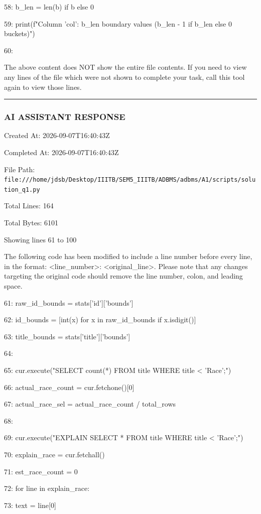 \documentclass[11pt,a4paper]{article}
\begin{document}
58:         b\_len = len(b) if b else 0

59:         print(f"Column '{col}': {b\_len} boundary values ({b\_len - 1 if b\_len else 0} buckets)")

60:

The above content does NOT show the entire file contents. If you need to view any lines of the file which were not shown to complete your task, call this tool again to view those lines.


\hrule

\subsubsection{AI ASSISTANT RESPONSE}

Created At: 2026-09-07T16:40:43Z

Completed At: 2026-09-07T16:40:43Z

File Path: \texttt{file:///home/jdsb/Desktop/IIITB/SEM5\_IIITB/ADBMS/adbms/A1/scripts/solution\_q1.py}

Total Lines: 164

Total Bytes: 6101

Showing lines 61 to 100

The following code has been modified to include a line number before every line, in the format: <line\_number>: <original\_line>. Please note that any changes targeting the original code should remove the line number, colon, and leading space.

61:     raw\_id\_bounds = stats['id']['bounds']

62:     id\_bounds = [int(x) for x in raw\_id\_bounds if x.isdigit()]

63:     title\_bounds = stats['title']['bounds']

64:

65:     cur.execute("SELECT count(*) FROM title WHERE title < 'Race';")

66:     actual\_race\_count = cur.fetchone()[0]

67:     actual\_race\_sel = actual\_race\_count / total\_rows

68:

69:     cur.execute("EXPLAIN SELECT * FROM title WHERE title < 'Race';")

70:     explain\_race = cur.fetchall()

71:     est\_race\_count = 0

72:     for line in explain\_race:

73:         text = line[0]
\end{document}
